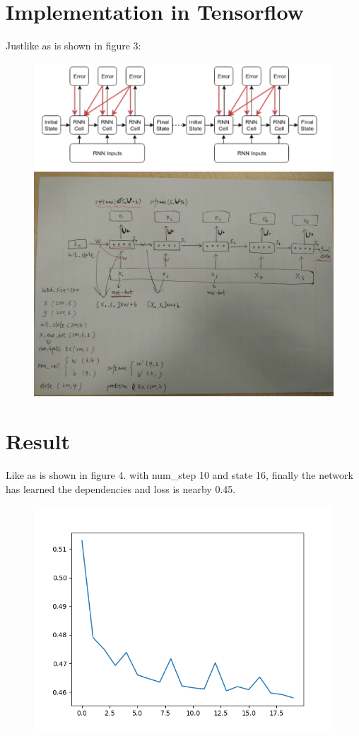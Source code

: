 \documentclass[11pt]{article}
\begin{document}
\section{Implementation in Tensorflow}
Justlike as is shown in figure 3:
\begin{figure}
	\centering
	\includegraphics[width=0.9\linewidth]{pic/555}
	\includegraphics[width=0.9\linewidth]{pic/RNN_14}
	\caption{}
	\label{fig:555}
\end{figure}
\section{Result}
Like as is shown in figure 4. with num\_step 10 and state 16, finally the network has learned the dependencies and loss is nearby 0.45.
\begin{figure}
	\centering
	\includegraphics[width=0.7\linewidth]{pic/RNN_15}
	\caption{}
	\label{fig:rnn15}
\end{figure}
\end{document}
